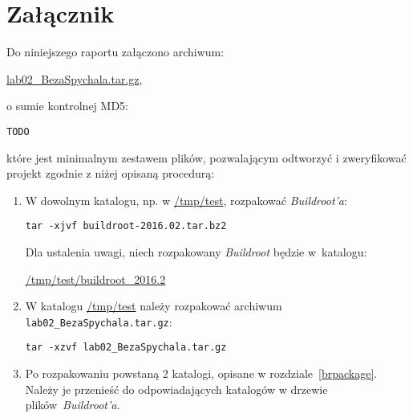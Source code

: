\documentclass{article}
\newcommand{\labnumber}{2}
\begin{document}

\section{Załącznik}

Do niniejszego raportu załączono archiwum:
\begin{center}
\url{lab0\labnumber\_BezaSpychala.tar.gz},
\end{center}
o sumie kontrolnej MD5:
\begin{center}
\texttt{TODO}
\end{center}
które jest minimalnym zestawem plików, pozwalającym odtworzyć i zweryfikować projekt zgodnie z niżej opisaną procedurą:
\begin{enumerate}
\item W dowolnym katalogu, np. w \url{/tmp/test}, rozpakować \emph{Buildroot'a}:
\begin{center}
\texttt{tar -xjvf buildroot-2016.02.tar.bz2}
\end{center}

Dla ustalenia uwagi, niech rozpakowany \emph{Buildroot} będzie w~katalogu:
\begin{center}
\url{/tmp/test/buildroot\_2016.2}
\end{center}

\item W katalogu \url{/tmp/test} należy rozpakować archiwum \texttt{lab0\labnumber\_BezaSpychala.tar.gz}:
\begin{center}
\texttt{tar -xzvf lab0\labnumber\_BezaSpychala.tar.gz}
\end{center}

\item Po rozpakowaniu powstaną 2 katalogi, opisane w rozdziale~\ref{brpackage}. Należy je przenieść do odpowiadających katalogów w drzewie plików~\emph{Buildroot'a}.
\end{enumerate}




\end{document}
